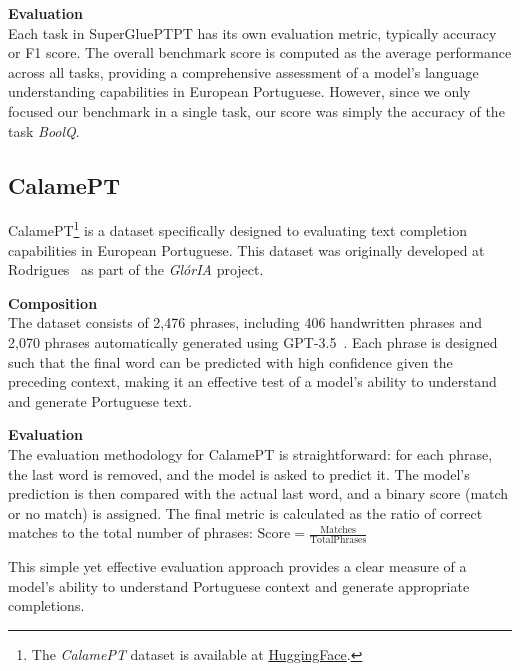 \textbf{Evaluation}\\
Each task in SuperGluePTPT has its own evaluation metric, typically accuracy or F1 score. The overall benchmark score is computed as the average performance across all tasks, providing a comprehensive assessment of a model's language understanding capabilities in European Portuguese. However, since we only focused our benchmark in a single task, our score was simply the accuracy of the task \textit{BoolQ}.

\subsection{CalamePT}\label{Section3.3.2}\label{subsec:dataset-calamept}
CalamePT\footnote{The \textit{CalamePT} dataset is available at \href{https://huggingface.co/datasets/NOVA-vision-language/calame-pt}{HuggingFace}.}
 is a dataset specifically designed to evaluating text completion capabilities in European Portuguese. This dataset was originally developed at Rodrigues~\cite{Gloria} as part of the \textit{GlórIA} project.

\textbf{Composition}\\
The dataset consists of 2,476 phrases, including 406 handwritten phrases and 2,070 phrases automatically generated using GPT-3.5~\cite{chatgpt}. Each phrase is designed such that the final word can be predicted with high confidence given the preceding context, making it an effective test of a model's ability to understand and generate Portuguese text.

\textbf{Evaluation}\\
The evaluation methodology for CalamePT is straightforward: for each phrase, the last word is removed, and the model is asked to predict it. The model's prediction is then compared with the actual last word, and a binary score (match or no match) is assigned. The final metric is calculated as the ratio of correct matches to the total number of phrases: $\text{Score} = \frac{\text{Matches}}{\text{TotalPhrases}}$

This simple yet effective evaluation approach provides a clear measure of a model's ability to understand Portuguese context and generate appropriate completions.
